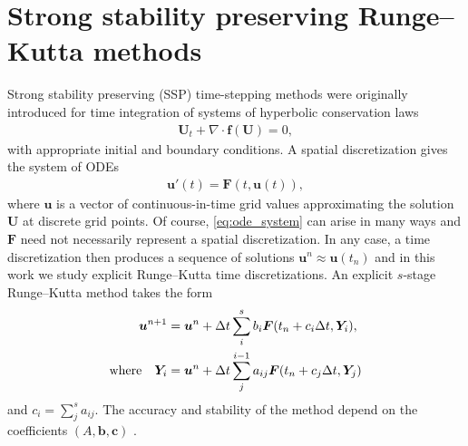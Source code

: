 \section{Strong stability preserving Runge--Kutta methods}\label{sec:SSP}
Strong stability preserving (SSP) time-stepping methods were originally introduced
for time integration of systems of hyperbolic conservation laws
\cite{Shu/Osher:1988} 
\begin{align}\label{eq:pde}
	\bm{U}_t + \nabla \cdot \bm{f}(\bm{U}) = 0,   
\end{align}
with appropriate initial and boundary conditions.
A spatial discretization gives the system of ODEs
\begin{align}\label{eq:ode_system}
    \bm{u}'(t) = \bm{F}(t,\bm{u}(t)),
\end{align}
where $\bm{u}$ is a vector of continuous-in-time grid values approximating 
the solution $\bm{U}$ at discrete grid points.
Of course, \eqref{eq:ode_system} can arise in many ways and $\bm{F}$
need not necessarily represent a spatial discretization.
In any case, a time discretization then produces a sequence of
solutions
$\bm{u}^{n} \approx \bm{u}(t_n)$ and in this work we study explicit 
Runge--Kutta time discretizations.
An explicit $s$-stage Runge--Kutta method takes the form
\begin{align*}
	\bm{u}^{n+1} &= \bm{u}^{n} + \Delta t \sum_i^s b_i \bm{F}(t_n + c_i \Delta t,\bm{Y}_i), \\
	\text{where} \quad \bm{Y}_i &= \bm{u}^{n} + \Delta t \sum_j^{i-1} a_{ij} \bm{F}(t_n + c_j \Delta t,\bm{Y}_j)
\end{align*}
and $c_i = \sum_j^sa_{ij}$.
The accuracy and stability of the method depend on the coefficients
$(A,\bm{b},\bm{c})$ \cite{Butcher2008_book}.

